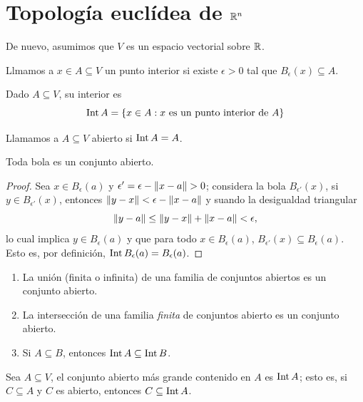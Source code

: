 \chapter{Topología euclídea de $\mathbb{R}^n$}
De nuevo, asumimos que $V$ es un espacio vectorial sobre $\mathbb{R}$.
\begin{definition}
  Llmamos a $x\in A\subseteq V$ un punto interior si existe $\epsilon >0$ tal que $B_\epsilon (x)\subseteq A$.
\end{definition}
\begin{definition}
  Dado $A\subseteq V$, su interior es \[
      \operatorname{Int} A = \{x\in A : x \text{ es un punto interior de } A\} 
  \] 
\end{definition}
\begin{definition}
  Llamamos a $A\subseteq V$ abierto si $\operatorname{Int} A=A$.
\end{definition}
\begin{lemma}
  Toda bola es un conjunto abierto.
\end{lemma}
\begin{proof}
  Sea $x \in B_\epsilon (a)$ y $\epsilon '= \epsilon -\lVert x-a\rVert>0$; considera la bola $B_{\epsilon'}(x)$, si $y\in B_{\epsilon'}(x)$, entonces $\lVert y-x\rVert<\epsilon - \lVert x-a\rVert$ y suando la desigualdad triangular \[
      \lVert y-a\rVert\leq \lVert y-x\rVert+\lVert x-a\rVert< \epsilon ,
    \] lo cual implica $y\in B_\epsilon (a)$ y que para todo $x\in B_\epsilon (a)$, $B_{\epsilon'} (x) \subseteq B_\epsilon (a)$. Esto es, por definición, $\operatorname{Int} B_\epsilon (a)= B_\epsilon (a)$.
\end{proof}
\begin{proposition}
  \begin{enumerate}
    \item La unión (finita o infinita) de una familia de conjuntos abiertos es un conjunto abierto.
    \item La intersección de una familia \emph{finita} de conjuntos abierto es un conjunto abierto.
    \item Si $A \subseteq B$, entonces $\operatorname{Int} A \subseteq \operatorname{Int} B$.
  \end{enumerate}
\end{proposition}
\begin{lemma}
  \label{lemma:conjunto_abierto_mas_grande_es_Int}
 Sea $A\subseteq V$, el conjunto abierto más grande contenido en $A$ es $\operatorname{Int} A$; esto es, si $C\subseteq A$ y $C$ es abierto, entonces $C \subseteq \operatorname{Int} A$.
 \end{lemma}

